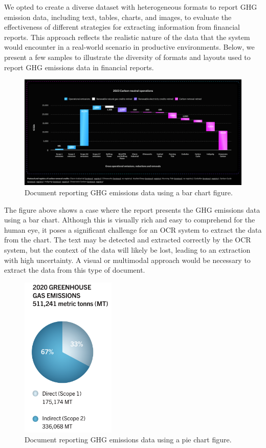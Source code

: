 \documentclass[english, 12pt, a4paper, elec, utf8, a-2b, online]{aaltothesis}
\begin{document}
We opted to create a diverse dataset with heterogeneous formats to report \ac{GHG} emission data, including text, tables, charts, and images, to evaluate the effectiveness of different strategies for extracting information from financial reports.
This approach reflects the realistic nature of the data that the system would encounter in a real-world scenario in productive environments.
Below, we present a few samples to illustrate the diversity of formats and layouts used to report \ac{GHG} emissions data in financial reports.

\begin{figure}[H]
    \centering
    \includegraphics[width=\textwidth]{images/ghg_emissions_bar_chart.png}
    \caption{Document reporting \ac{GHG} emissions data using a bar chart figure.}
    \label{ghg_emissions_bar_chart}
\end{figure}

The figure above shows a case where the report presents the \ac{GHG} emissions data using a bar chart.
Although this is visually rich and easy to comprehend for the human eye, it poses a significant challenge for an \ac{OCR} system to extract the data from the chart.
The text may be detected and extracted correctly by the \ac{OCR} system, but the context of the data will likely be lost, leading to an extraction with high uncertainty.
A visual or multimodal approach would be necessary to extract the data from this type of document.

\begin{figure}[H]
    \centering
    \includegraphics[width=0.4\textwidth]{images/ghg_emissions_pie_chart.png}
    \caption{Document reporting \ac{GHG} emissions data using a pie chart figure.}
    \label{ghg_emissions_pie_chart}
\end{figure}
\end{document}
